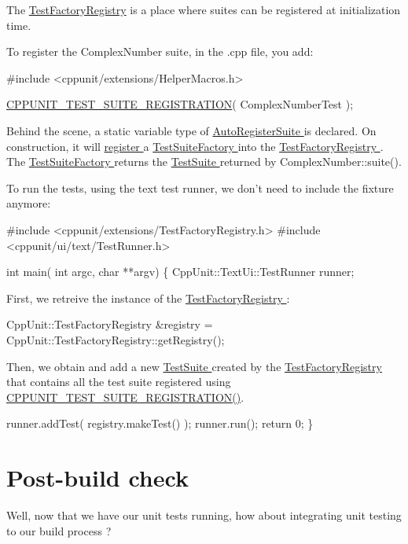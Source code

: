 The \hyperlink{class_test_factory_registry}{Test\+Factory\+Registry} is a place where suites can be registered at initialization time.

To register the Complex\+Number suite, in the .cpp file, you add\+:


\begin{DoxyCode}
\textcolor{preprocessor}{#include <cppunit/extensions/HelperMacros.h>}

\hyperlink{group___creating_test_suite_ga2f4071eec88d1e306665ada0f2dd80e4}{CPPUNIT\_TEST\_SUITE\_REGISTRATION}( ComplexNumberTest );
\end{DoxyCode}


Behind the scene, a static variable type of \hyperlink{}{Auto\+Register\+Suite } is declared. On construction, it will \hyperlink{}{register } a \hyperlink{}{Test\+Suite\+Factory } into the \hyperlink{}{Test\+Factory\+Registry }. The \hyperlink{}{Test\+Suite\+Factory } returns the \hyperlink{}{Test\+Suite } returned by Complex\+Number\+::suite().

To run the tests, using the text test runner, we don't need to include the fixture anymore\+:


\begin{DoxyCode}
\textcolor{preprocessor}{#include <cppunit/extensions/TestFactoryRegistry.h>}
\textcolor{preprocessor}{#include <cppunit/ui/text/TestRunner.h>}

\textcolor{keywordtype}{int} main( \textcolor{keywordtype}{int} argc, \textcolor{keywordtype}{char} **argv)
\{
  CppUnit::TextUi::TestRunner runner;
\end{DoxyCode}
 First, we retreive the instance of the \hyperlink{}{Test\+Factory\+Registry }\+: 
\begin{DoxyCode}
CppUnit::TestFactoryRegistry &registry = CppUnit::TestFactoryRegistry::getRegistry();
\end{DoxyCode}
 Then, we obtain and add a new \hyperlink{}{Test\+Suite } created by the \hyperlink{}{Test\+Factory\+Registry } that contains all the test suite registered using \hyperlink{group___creating_test_suite_ga2f4071eec88d1e306665ada0f2dd80e4}{C\+P\+P\+U\+N\+I\+T\+\_\+\+T\+E\+S\+T\+\_\+\+S\+U\+I\+T\+E\+\_\+\+R\+E\+G\+I\+S\+T\+R\+A\+T\+I\+O\+N()}. 
\begin{DoxyCode}
  runner.addTest( registry.makeTest() );
  runner.run();
  \textcolor{keywordflow}{return} 0;
\}
\end{DoxyCode}
\hypertarget{cppunit_cookbook_post_build_check}{}\section{Post-\/build check}\label{cppunit_cookbook_post_build_check}
Well, now that we have our unit tests running, how about integrating unit testing to our build process ?

